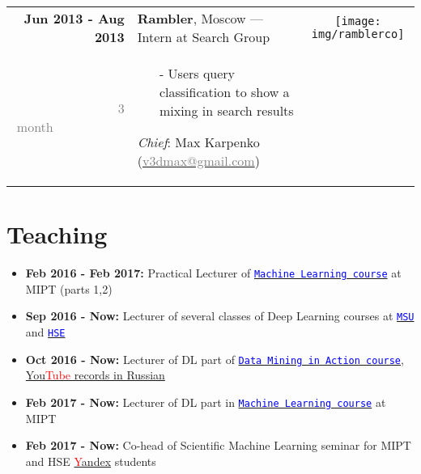 \documentclass[a4paper,10pt]{article} %
\begin{document}
\begin{tabular}{r|p{11.5cm}c}
\textbf{Jun 2013 - Aug 2013} & 
\textbf{Rambler}, Moscow --- Intern at Search Group&
\multirow{1}{*}{\texttt{[image: img/ramblerco]}}\\ 
\textcolor{gray}{3 month}~~~~~~~~~~~& 
\footnotesize{

\vspace{-0.25cm}
\begin{itemize}
	\item[-] Users query classification to show a mixing in search results
\end{itemize}
\scriptsize{
	\emph{Chief}:  
Max Karpenko
(\href{mailto:v3dmax@gmail.com}{\textcolor{gray}{v3dmax@gmail.com}})}
\vspace{-0.1cm}
}& 
\\
\end{tabular}

\section{Teaching}
\begin{itemize}
	\item \textbf{Feb 2016 - Feb 2017:} Practical Lecturer of  \href{https://ml-mipt.github.io/}{\texttt{\textcolor{blue}{Machine Learning course}}} at  MIPT (parts 1,2)
	\item \textbf{Sep 2016 - Now:} Lecturer of several classes of Deep Learning courses at \href{https://goo.gl/3wXB4f}{\texttt{\textcolor{blue}{MSU}}} and \href{https://github.com/yandexdataschool/HSE_deeplearning}{\texttt{\textcolor{blue}{HSE}}}
	\item  \textbf{Oct 2016 - Now:}  Lecturer of DL part of \href{https://vk.com/data_mining_in_action}{\texttt{\textcolor{blue}{Data Mining in Action course}}}, \href{https://www.youtube.com/channel/UCop3CelRVvrchG5lsPyxvHg}{You\textcolor{red}{Tube} records  in Russian \frownie}
	\item  \textbf{Feb 2017 - Now:}  Lecturer of DL part in \href{https://ml-mipt.github.io/}{\texttt{\textcolor{blue}{Machine Learning course}}} at MIPT
	\item  \textbf{Feb 2017 - Now:}  Co-head of Scientific Machine Learning seminar for MIPT and HSE \href{https://yandexdataschool.com/}{\textcolor{red}{Y}andex} students
\end{itemize}
\end{document}
